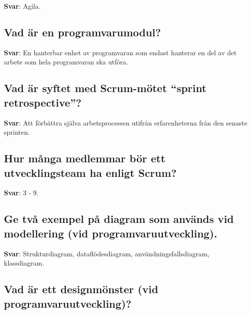 \documentclass[a4paper,11pt,oneside]{article}
\begin{document}
\begin{sloppypar}
\label{q:241:sa:sv:True}

\textbf{Svar}: Agila.



\subsection{Vad \"ar en programvarumodul?}

\label{q:242:sa:sv:True}

\textbf{Svar}: En hanterbar enhet av programvaran som endast hanterar en del av det arbete som hela programvaran ska utf\"ora.



\subsection{Vad \"ar syftet med Scrum-m\"otet {\textquotedblleft}sprint retrospective{\textquotedblright}?}

\label{q:243:sa:sv:True}

\textbf{Svar}: Att f\"orb\"attra sj\"alva arbetsprocessen utifr\r{a}n erfarenheterna fr\r{a}n den senaste sprinten.



\subsection{Hur m\r{a}nga medlemmar b\"or ett utvecklingsteam ha enligt Scrum?}

\label{q:244:sa:sv:True}

\textbf{Svar}: 3 - 9.



\subsection{Ge tv\r{a} exempel p\r{a} diagram som anv\"ands vid modellering (vid programvaruutveckling).}

\label{q:245:sa:sv:True}

\textbf{Svar}: Strukturdiagram, datafl\"odesdiagram, anv\"andningsfallsdiagram, klassdiagram.



\subsection{Vad \"ar ett designm\"onster (vid programvaruutveckling)?}

\label{q:246:sa:sv:True}


\end{sloppypar}
\end{document}
